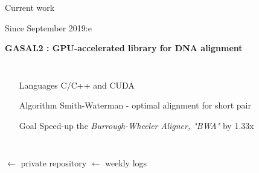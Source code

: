 
\begin{frame}{Current work}

	\begin{center}
		Since September 2019:e
		
		\textbf{GASAL2 : GPU-accelerated library for DNA alignment}
	
	\begin{columns}
		\begin{itemize}
			\item[Languages] C/C++ and CUDA
			\item[Algorithm] Smith-Waterman - optimal alignment for short pair
			\item[Goal] Speed-up the \emph{Burrough-Wheeler Aligner, "BWA"} by 1.33x
		\end{itemize}	
	\end{columns}

	\bigskip
	
	\bigskip
	
	\bigskip
	
	
	\end{center}
	{
		\small
		 $\leftarrow$ private repository
		 $\leftarrow$ weekly logs
	
	}
	
\end{frame}